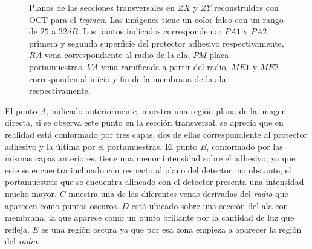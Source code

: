 \begin{figure}[ht!]
	\centering
	\caption[Planos de las secciones transversales del ala de \textit{blattodea}]{Planos de las secciones transversales en $ZX$ y $ZY$ reconstruidos con OCT para el \emph{tegmen}. Las imágenes tiene un color falso con un rango de $25$ a $32dB$. Los puntos indicados corresponden a: $PA1$ y $PA2$ primera y segunda superficie del protector adhesivo respectivamente, $RA$ vena correspondiente al radio de la ala, $PM$ placa portamuestras, $VA$ vena ramificada a partir del radio, $ME1$ y $ME2$ corresponden al inicio y fin de la membrana de la ala respectivamente.}
	\label{fig:blattodeaplanos}
\end{figure}

El punto $A$, indicado anteriormente, muestra una región plana de la imagen directa, si se observa este punto en la sección transversal, se aprecia que en realidad está conformado por tres capas, dos de ellas correspondiente al protector adhesivo y la última por el portamuestras. El punto $B$, conformado por las mismas capas anteriores, tiene una menor intensidad sobre el adhesivo, ya que este se encuentra inclinado con respecto al plano del detector, no obstante, el portamuestras que se encuentra alineado con el detector presenta una intensidad mucho mayor. $C$ muestra una de las diferentes venas derivadas del \emph{radio} que aparecen como puntos oscuros. $D$ está ubicado sobre una sección del ala con membrana, la que aparece como un punto brillante por la cantidad de luz que refleja. $E$ es una región oscura ya que por esa zona empieza a aparecer la región del \emph{radio}.

